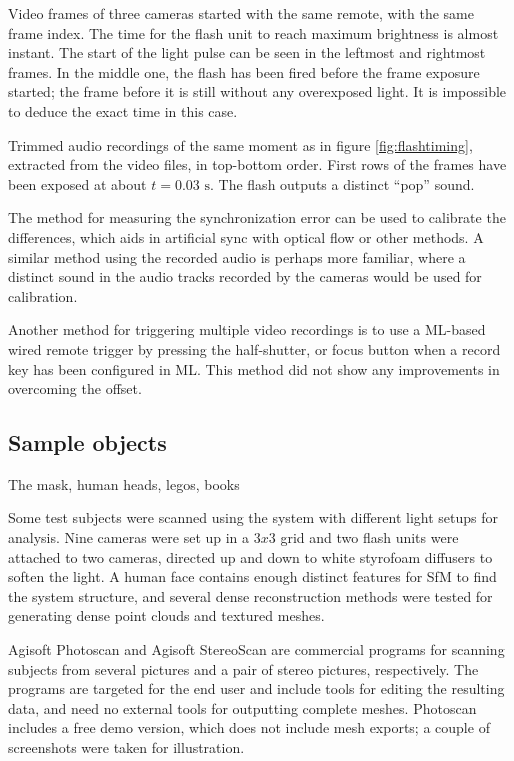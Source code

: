 {Video frames of three cameras started with the same remote, with the same frame index.
The time for the flash unit to reach maximum brightness is almost instant.
The start of the light pulse can be seen in the leftmost and rightmost frames.
In the middle one, the flash has been fired before the frame exposure started;
the frame before it is still without any overexposed light.
It is impossible to deduce the exact time in this case.
}

{Trimmed audio recordings of the same moment as in figure \ref{fig:flashtiming}, extracted from the video files, in top-bottom order.
First rows of the frames have been exposed at about $t = 0.03 \text{ s}$.
The flash outputs a distinct ``pop'' sound.
}


The method for measuring the synchronization error can be used to calibrate the differences, which aids in artificial sync with optical flow or other methods.
A similar method using the recorded audio is perhaps more familiar, where a distinct sound in the audio tracks recorded by the cameras would be used for calibration.

Another method for triggering multiple video recordings is to use a ML-based wired remote trigger by pressing the half-shutter, or focus button when a record key has been configured in ML.
This method did not show any improvements in overcoming the offset.

\subsection{Sample objects}

The mask, human heads, legos, books

Some test subjects were scanned using the system with different light setups for analysis.
Nine cameras were set up in a $3 x 3$ grid and two flash units were attached to two cameras, directed up and down to white styrofoam diffusers to soften the light.
A human face contains enough distinct features for SfM to find the system structure, and several dense reconstruction methods were tested for generating dense point clouds and textured meshes.

Agisoft Photoscan and Agisoft StereoScan are commercial programs for scanning subjects from several pictures and a pair of stereo pictures, respectively. \cite{agisoft}
The programs are targeted for the end user and include tools for editing the resulting data, and need no external tools for outputting complete meshes.
Photoscan includes a free demo version, which does not include mesh exports; a couple of screenshots were taken for illustration.

